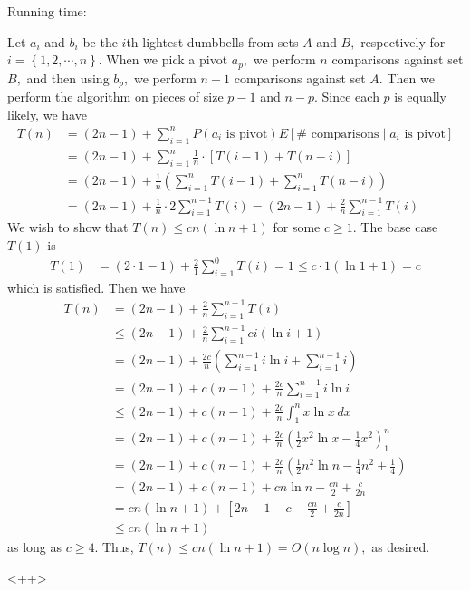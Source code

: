 \documentclass{article}
\begin{document}
\begin{soln}
	Running time:
	\begin{subproof}
		Let $a_i$ and $b_i$ be the $i$th lightest dumbbells from sets $A$ and $B,$ respectively for $i=\left\{ 1, 2, \cdots, n \right\}.$ When we pick a pivot $a_p,$ we perform $n$ comparisons against set $B,$ and then using $b_p,$ we perform $n-1$ comparisons against set $A.$ Then we perform the algorithm on pieces of size $p-1$ and $n-p.$ Since each $p$ is equally likely, we have
		\begin{align*}
			T(n) &= (2n-1) + \sum_{i=1}^{n} P(a_i\text{ is pivot}) E[\#\text{ comparisons}\mid a_i\text{ is pivot}] \\
			&= (2n-1) + \sum_{i=1}^{n}\frac{1}{n}\cdot \left[ T(i-1) + T(n-i) \right] \\
			&= (2n-1) + \frac{1}{n}\left( \sum_{i=1}^{n} T(i-1) + \sum_{i=1}^{n} T(n-i) \right) \\
			&= (2n-1) + \frac{1}{n}\cdot 2\sum_{i=1}^{n-1} T(i) = (2n-1) + \frac{2}{n} \sum_{i=1}^{n-1} T(i)
		\end{align*}
		We wish to show that $T(n)\le cn(\ln n + 1)$ for some $c\ge 1.$ The base case $T(1)$ is
		\begin{align*}
			T(1) &= (2\cdot 1 - 1) + \frac{2}{1}\sum_{i=1}^{0} T(i) = 1 \le c\cdot 1(\ln 1+1) = c
		\end{align*}
		which is satisfied. Then we have
		\begin{align*}
			T(n) &= (2n-1) + \frac{2}{n} \sum_{i=1}^{n-1} T(i) \\
			&\le (2n-1) + \frac{2}{n} \sum_{i=1}^{n-1} ci(\ln i + 1) \\
			&= (2n-1) + \frac{2c}{n} \left( \sum_{i=1}^{n-1} i\ln i + \sum_{i=1}^{n-1} i \right) \\
			&= (2n-1) + c(n-1) + \frac{2c}{n} \sum_{i=1}^{n-1} i\ln i  \\
			&\le (2n-1) + c(n-1) + \frac{2c}{n}\int_1^n x\ln x\, dx \\
			&= (2n-1) + c(n-1) + \frac{2c}{n} \left( \frac{1}{2}x^2\ln x - \frac{1}{4}x^2 \right)^n_1 \\
			&= (2n-1) + c(n-1) + \frac{2c}{n} \left( \frac{1}{2}n^2\ln n - \frac{1}{4}n^2 + \frac{1}{4} \right) \\
			&= (2n-1) + c(n-1) + cn\ln n - \frac{cn}{2} + \frac{c}{2n} \\
			&= cn(\ln n + 1) + \left[ 2n-1-c - \frac{cn}{2} + \frac{c}{2n} \right] \\
			&\le cn(\ln n+1)
		\end{align*}
		as long as $c\ge 4.$ Thus, $T(n)\le cn(\ln n+1) = O(n\log n),$ as desired.
	\end{subproof}
\end{soln}<++>
\end{document}

